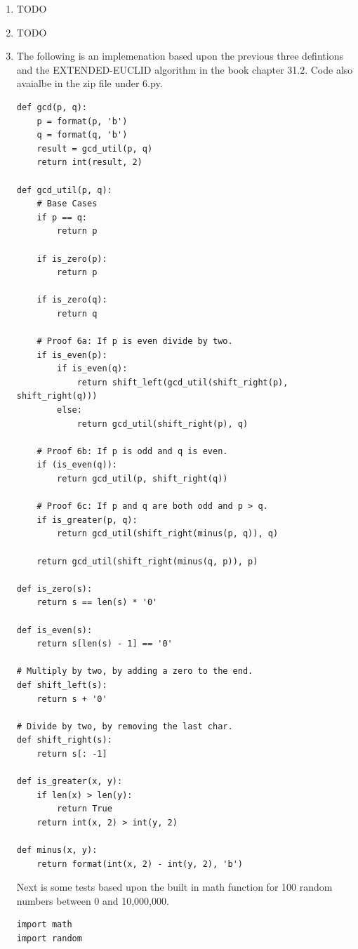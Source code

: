 \documentclass{article}
\begin{document}
\begin{enumerate}
\begin{enumerate}
        \item TODO
        \item TODO
        
        \item The following is an implemenation based upon the previous three defintions and the EXTENDED-EUCLID algorithm in the book chapter 31.2. Code also avaialbe in the zip file under 6.py.
        
        \begin{lstlisting}
def gcd(p, q):
    p = format(p, 'b')
    q = format(q, 'b')
    result = gcd_util(p, q)
    return int(result, 2)

def gcd_util(p, q):
    # Base Cases
    if p == q:
        return p

    if is_zero(p):
        return p

    if is_zero(q):
        return q

    # Proof 6a: If p is even divide by two.
    if is_even(p):
        if is_even(q):
            return shift_left(gcd_util(shift_right(p), shift_right(q)))
        else:
            return gcd_util(shift_right(p), q)

    # Proof 6b: If p is odd and q is even.
    if (is_even(q)):
        return gcd_util(p, shift_right(q))

    # Proof 6c: If p and q are both odd and p > q.
    if is_greater(p, q):
        return gcd_util(shift_right(minus(p, q)), q)

    return gcd_util(shift_right(minus(q, p)), p)

def is_zero(s):
    return s == len(s) * '0'

def is_even(s):
    return s[len(s) - 1] == '0'

# Multiply by two, by adding a zero to the end.
def shift_left(s):
    return s + '0'

# Divide by two, by removing the last char.
def shift_right(s):
    return s[: -1]

def is_greater(x, y):
    if len(x) > len(y):
        return True
    return int(x, 2) > int(y, 2)

def minus(x, y):
    return format(int(x, 2) - int(y, 2), 'b')            
        \end{lstlisting}

        Next is some tests based upon the built in math function for 100 random numbers between 0 and 10,000,000.

        \begin{lstlisting}
import math
import random


\end{lstlisting}
\end{enumerate}
\end{enumerate}
\end{document}
